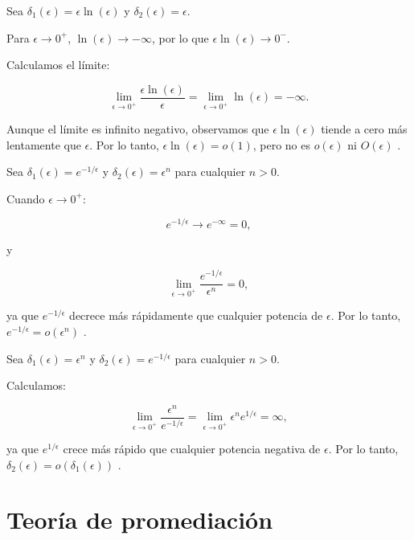 \begin{example}
    Sea \(\delta_1(\epsilon) = \epsilon \ln(\epsilon)\) y \(\delta_2(\epsilon) = \epsilon\).

Para \(\epsilon \to 0^+\), \(\ln(\epsilon) \to -\infty\), por lo que \(\epsilon \ln(\epsilon) \to 0^-\).

Calculamos el límite:

\[
\lim_{\epsilon \to 0^+} \frac{\epsilon \ln(\epsilon)}{\epsilon} = \lim_{\epsilon \to 0^+} \ln(\epsilon) = -\infty.
\]

Aunque el límite es infinito negativo, observamos que \(\epsilon \ln(\epsilon)\) tiende a cero más lentamente que \(\epsilon\). Por lo tanto, \(\epsilon \ln(\epsilon) = o(1)\), pero no es \(o\left( \epsilon \right)\) ni \(O\left( \epsilon \right)\) \cite{bender2013advanced}.

\end{example}

\begin{example}
    Sea \(\delta_1(\epsilon) = e^{-1/\epsilon}\) y \(\delta_2(\epsilon) = \epsilon^n\) para cualquier \(n > 0\).

Cuando \(\epsilon \to 0^+\):

\[
e^{-1/\epsilon} \to e^{-\infty} = 0,
\]

y

\[
\lim_{\epsilon \to 0^+} \frac{e^{-1/\epsilon}}{\epsilon^n} = 0,
\]

ya que \(e^{-1/\epsilon}\) decrece más rápidamente que cualquier potencia de \(\epsilon\). Por lo tanto, \(e^{-1/\epsilon} = o\left( \epsilon^n \right)\) \cite{bender2013advanced}.

\end{example}

\begin{example}
    Sea \(\delta_1(\epsilon) = \epsilon^n\) y \(\delta_2(\epsilon) = e^{-1/\epsilon}\) para cualquier \(n > 0\).

Calculamos:

\[
\lim_{\epsilon \to 0^+} \frac{\epsilon^n}{e^{-1/\epsilon}} = \lim_{\epsilon \to 0^+} \epsilon^n e^{1/\epsilon} = \infty,
\]

ya que \(e^{1/\epsilon}\) crece más rápido que cualquier potencia negativa de \(\epsilon\). Por lo tanto, \(\delta_2(\epsilon) = o\left( \delta_1(\epsilon) \right)\) \cite{bender2013advanced}.

\end{example}

\section{Teoría de promediación}


